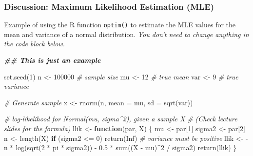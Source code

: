 \documentclass[]{article}
\newenvironment{Shaded}{\begin{snugshade}}{\end{snugshade}}
\newcommand{\AttributeTok}[1]{\textcolor[rgb]{0.77,0.63,0.00}{#1}}
\newcommand{\CommentTok}[1]{\textcolor[rgb]{0.56,0.35,0.01}{\textit{#1}}}
\newcommand{\ConstantTok}[1]{\textcolor[rgb]{0.00,0.00,0.00}{#1}}
\newcommand{\ControlFlowTok}[1]{\textcolor[rgb]{0.13,0.29,0.53}{\textbf{#1}}}
\newcommand{\DecValTok}[1]{\textcolor[rgb]{0.00,0.00,0.81}{#1}}
\newcommand{\DocumentationTok}[1]{\textcolor[rgb]{0.56,0.35,0.01}{\textbf{\textit{#1}}}}
\newcommand{\FloatTok}[1]{\textcolor[rgb]{0.00,0.00,0.81}{#1}}
\newcommand{\FunctionTok}[1]{\textcolor[rgb]{0.00,0.00,0.00}{#1}}
\newcommand{\NormalTok}[1]{#1}
\newcommand{\OtherTok}[1]{\textcolor[rgb]{0.56,0.35,0.01}{#1}}
\newcommand{\SpecialCharTok}[1]{\textcolor[rgb]{0.00,0.00,0.00}{#1}}
\begin{document}
\hypertarget{discussion-maximum-likelihood-estimation-mle}{%
\subsubsection{Discussion: Maximum Likelihood Estimation
(MLE)}\label{discussion-maximum-likelihood-estimation-mle}}

Example of using the R function \texttt{optim()} to estimate the MLE
values for the mean and variance of a normal distribution. \emph{You
don't need to change anything in the code block below.}

\begin{Shaded}
\begin{Highlighting}[]
\DocumentationTok{\#\# This is just an example}

\FunctionTok{set.seed}\NormalTok{(}\DecValTok{1}\NormalTok{)}
\NormalTok{n    }\OtherTok{\textless{}{-}} \DecValTok{100000} \CommentTok{\# sample size}
\NormalTok{mu   }\OtherTok{\textless{}{-}} \DecValTok{12}     \CommentTok{\# true mean}
\NormalTok{var  }\OtherTok{\textless{}{-}} \DecValTok{9}      \CommentTok{\# true variance}


\CommentTok{\# Generate sample}
\NormalTok{x }\OtherTok{\textless{}{-}} \FunctionTok{rnorm}\NormalTok{(n, }\AttributeTok{mean =}\NormalTok{ mu, }\AttributeTok{sd =} \FunctionTok{sqrt}\NormalTok{(var))}

\CommentTok{\# log{-}likelihood for Normal(mu, sigma\^{}2), given a sample X}
\CommentTok{\# (Check lecture slides for the formula)}
\NormalTok{llik }\OtherTok{\textless{}{-}} \ControlFlowTok{function}\NormalTok{(par, X) \{}
\NormalTok{  mu     }\OtherTok{\textless{}{-}}\NormalTok{ par[}\DecValTok{1}\NormalTok{]}
\NormalTok{  sigma2 }\OtherTok{\textless{}{-}}\NormalTok{ par[}\DecValTok{2}\NormalTok{]}
\NormalTok{  n      }\OtherTok{\textless{}{-}} \FunctionTok{length}\NormalTok{(X)}
  \ControlFlowTok{if}\NormalTok{ (sigma2 }\SpecialCharTok{\textless{}=} \DecValTok{0}\NormalTok{) }\FunctionTok{return}\NormalTok{(}\ConstantTok{Inf}\NormalTok{)  }\CommentTok{\# variance must be positive}
\NormalTok{  llik }\OtherTok{\textless{}{-}} \SpecialCharTok{{-}}\NormalTok{n }\SpecialCharTok{*} \FunctionTok{log}\NormalTok{(}\FunctionTok{sqrt}\NormalTok{(}\DecValTok{2} \SpecialCharTok{*}\NormalTok{ pi }\SpecialCharTok{*}\NormalTok{ sigma2)) }\SpecialCharTok{{-}} \FloatTok{0.5} \SpecialCharTok{*} \FunctionTok{sum}\NormalTok{((X }\SpecialCharTok{{-}}\NormalTok{ mu)}\SpecialCharTok{\^{}}\DecValTok{2} \SpecialCharTok{/}\NormalTok{ sigma2)}
  \FunctionTok{return}\NormalTok{(llik)}
\NormalTok{\}}


\end{Highlighting}
\end{Shaded}
\end{document}
